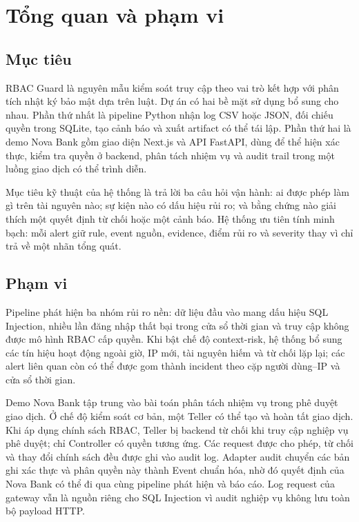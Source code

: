 \chapter{Tổng quan và phạm vi}

\section{Mục tiêu}

RBAC Guard là nguyên mẫu kiểm soát truy cập theo vai trò kết hợp với phân tích
nhật ký bảo mật dựa trên luật. Dự án có hai bề mặt sử dụng bổ sung cho nhau.
Phần thứ nhất là pipeline Python nhận log CSV hoặc JSON, đối chiếu quyền trong
SQLite, tạo cảnh báo và xuất artifact có thể tái lập. Phần thứ hai là demo Nova
Bank gồm giao diện Next.js và API FastAPI, dùng để thể hiện xác thực, kiểm tra
quyền ở backend, phân tách nhiệm vụ và audit trail trong một luồng giao dịch
có thể trình diễn.

Mục tiêu kỹ thuật của hệ thống là trả lời ba câu hỏi vận hành: ai được phép làm
gì trên tài nguyên nào; sự kiện nào có dấu hiệu rủi ro; và bằng chứng nào giải
thích một quyết định từ chối hoặc một cảnh báo. Hệ thống ưu tiên tính minh bạch:
mỗi alert giữ rule, event nguồn, evidence, điểm rủi ro và severity thay vì chỉ
trả về một nhãn tổng quát.

\section{Phạm vi}

Pipeline phát hiện ba nhóm rủi ro nền: dữ liệu đầu vào mang dấu hiệu SQL
Injection, nhiều lần đăng nhập thất bại trong cửa sổ thời gian và truy cập
không được mô hình RBAC cấp quyền. Khi bật chế độ context-risk, hệ thống bổ
sung các tín hiệu hoạt động ngoài giờ, IP mới, tài nguyên hiếm và từ chối lặp
lại; các alert liên quan còn có thể được gom thành incident theo cặp người
dùng--IP và cửa sổ thời gian.

Demo Nova Bank tập trung vào bài toán phân tách nhiệm vụ trong phê duyệt giao
dịch. Ở chế độ kiểm soát cơ bản, một Teller có thể tạo và hoàn tất giao dịch.
Khi áp dụng chính sách RBAC, Teller bị backend từ chối khi truy cập nghiệp vụ
phê duyệt; chỉ Controller có quyền tương ứng. Các request được cho phép, từ
chối và thay đổi chính sách đều được ghi vào audit log. Adapter audit chuyển
các bản ghi xác thực và phân quyền này thành Event chuẩn hóa, nhờ đó quyết định
của Nova Bank có thể đi qua cùng pipeline phát hiện và báo cáo. Log request của
gateway vẫn là nguồn riêng cho SQL Injection vì audit nghiệp vụ không lưu toàn
bộ payload HTTP.

